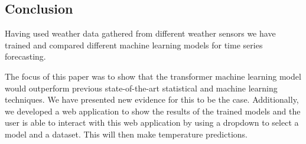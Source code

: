 \subsection{Conclusion}
Having used weather data gathered from different weather sensors we have trained and compared different machine learning models for time series forecasting.

The focus of this paper was to show that the transformer machine learning model would outperform previous state-of-the-art statistical and machine learning techniques. 
We have presented new evidence for this to be the case.
Additionally, we developed a web application to show the results of the trained models and the user is able to interact with this web application by using a dropdown to select a model and a dataset. This will then make temperature predictions.
